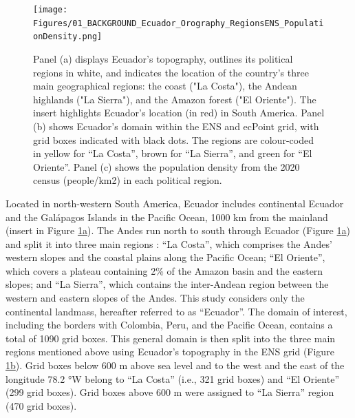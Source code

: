 \documentclass[techmemo]{ecmwfrep}%
\begin{document}
\begin{figure}
\centering
\texttt{[image: Figures/01\_BACKGROUND\_Ecuador\_Orography\_RegionsENS\_PopulationDensity.png]}
\caption{Panel (a) displays Ecuador's topography, outlines its political regions in white, and indicates the location of the country's three main geographical regions: the coast ("La Costa"), the Andean highlands ("La Sierra"), and the Amazon forest ("El Oriente"). The insert highlights Ecuador's location (in red) in South America. Panel (b) shows Ecuador's domain within the ENS and ecPoint grid, with grid boxes indicated with black dots. The regions are colour-coded in yellow for “La Costa”, brown for “La Sierra”, and green for “El Oriente”. Panel (c) shows the population density from the 2020 census (people/km2) in each political region.}
\label{fig:Background}
\end{figure}

Located in north-western South America, Ecuador includes continental Ecuador and the Galápagos Islands in the Pacific Ocean, 1000 km from the mainland (insert in Figure \ref{fig:Background}\hyperref[fig:Background]{a}). The Andes run north to south through Ecuador (Figure \ref{fig:Background}\hyperref[fig:Background]{a}) and split it into three main regions \citep{Vuille2000}: “La Costa”, which comprises the Andes’ western slopes and the coastal plains along the Pacific Ocean; “El Oriente”, which covers a plateau containing 2\% of the Amazon basin and the eastern slopes; and “La Sierra”, which contains the inter-Andean region between the western and eastern slopes of the Andes. This study considers only the continental landmass, hereafter referred to as “Ecuador”. The domain of interest, including the borders with Colombia, Peru, and the Pacific Ocean, contains a total of 1090 grid boxes. This general domain is then split into the three main regions mentioned above using Ecuador’s topography in the ENS grid (Figure \ref{fig:Background}\hyperref[fig:Background]{b}). Grid boxes below 600 m above sea level and to the west and the east of the longitude 78.2 °W belong to “La Costa” (i.e., 321 grid boxes) and “El Oriente” (299 grid boxes). Grid boxes above 600 m were assigned to “La Sierra” region (470 grid boxes).
\end{document}
